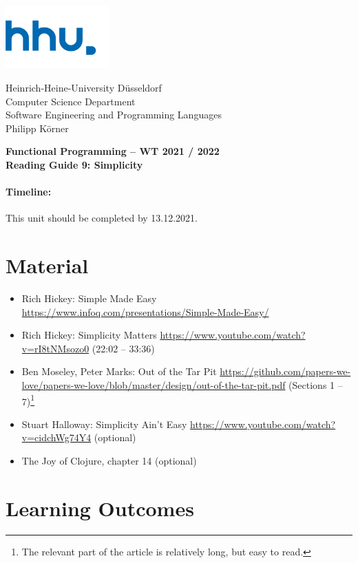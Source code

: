 \documentclass[11pt,a4paper]{article}
\begin{document}
\begin{minipage}[b]{\textwidth}
	\parbox[t]{5cm}{%
		\includegraphics[width=4cm]{unilogo}
		\hfill
	}
	\parbox[b]{11cm}{%
		Heinrich-Heine-University D\"usseldorf\\
		Computer Science Department\\
		Software Engineering and Programming Languages\\
		Philipp K\"orner
	}
\end{minipage}
\begin{center}
	\bf
	Functional Programming -- WT 2021 / 2022\\
	Reading Guide 9: Simplicity
\end{center}

\pagestyle{empty}

\paragraph{Timeline:} This unit should be completed by 13.12.2021.

\section{Material} 

\begin{itemize}
\item Rich Hickey: Simple Made Easy \url{https://www.infoq.com/presentations/Simple-Made-Easy/}
\item Rich Hickey: Simplicity Matters \url{https://www.youtube.com/watch?v=rI8tNMsozo0} (22:02 -- 33:36)
\item Ben Moseley, Peter Marks: Out of the Tar Pit \url{https://github.com/papers-we-love/papers-we-love/blob/master/design/out-of-the-tar-pit.pdf} (Sections 1 -- 7)\footnote{The relevant part of the article is relatively long, but easy to read.}
\item Stuart Halloway: Simplicity Ain't Easy \url{https://www.youtube.com/watch?v=cidchWg74Y4} (optional)
\item The Joy of Clojure, chapter 14 (optional)
\end{itemize}


\section{Learning Outcomes}
\end{document}
